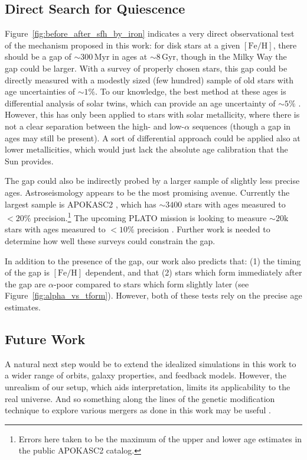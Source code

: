 \documentclass[twocolumn,linenumbers,trackchanges]{aastex631}
\newcommand{\Gyr}{\ensuremath{\textrm{Gyr}}}
\newcommand{\Myr}{\ensuremath{\textrm{Myr}}}
\newcommand{\FeH}{\ensuremath{[\textrm{Fe}/\textrm{H}]}}
\begin{document}
\subsection{Direct Search for Quiescence}\label{ssec:obsqui}
Figure~\ref{fig:before_after_sfh_by_iron} indicates a very direct observational test of the mechanism proposed in this work: for disk stars at a given \FeH{}, there should be a gap of $\sim300\,\Myr$ in ages at $\sim8\,\Gyr$, though in the Milky Way the gap could be larger. With a survey of properly chosen stars, this gap could be directly measured with a modestly sized (few hundred) sample of old stars with age uncertainties of $\sim1\%$. To our knowledge, the best method at these ages is differential analysis of solar twins, which can provide an age uncertainty of $\sim5\%$ \citep[e.g.][]{2014ApJ...795...23B,2018MNRAS.474.2580S}. However, this has only been applied to stars with solar metallicity, where there is not a clear separation between the high- and low-$\alpha$ sequences (though a gap in ages may still be present). A sort of differential approach could be applied also at lower metallicities, which would just lack the absolute age calibration that the Sun provides.

The gap could also be indirectly probed by a larger sample of slightly less precise ages. Astroseismology appears to be the most promising avenue. Currently the largest sample is APOKASC2 \citep{2018ApJS..239...32P}, which has $\sim3400$ stars with ages measured to $<20\%$ precision.\footnote{Errors here taken to be the maximum of the upper and lower age estimates in the public APOKASC2 catalog.} The upcoming PLATO mission is looking to measure $\sim20\textrm{k}$ stars with ages measured to $<10\%$ precision \citep{2024arXiv240605447R}. Further work is needed to determine how well these surveys could constrain the gap.

In addition to the presence of the gap, our work also predicts that: (1) the timing of the gap is \FeH{} dependent, and that (2) stars which form immediately after the gap are $\alpha$-poor compared to stars which form slightly later (see Figure~\ref{fig:alpha_vs_tform}). However, both of these tests rely on the precise age estimates.

\subsection{Future Work}
A natural next step would be to extend the idealized simulations in this work to a wider range of orbits, galaxy properties, and feedback models. However, the unrealism of our setup, which aids interpretation, limits its applicability to the real universe. And so something along the lines of the genetic modification technique to explore various mergers as done in this work may be useful \citep{2016MNRAS.455..974R,2017MNRAS.465..547P}.
\end{document}
